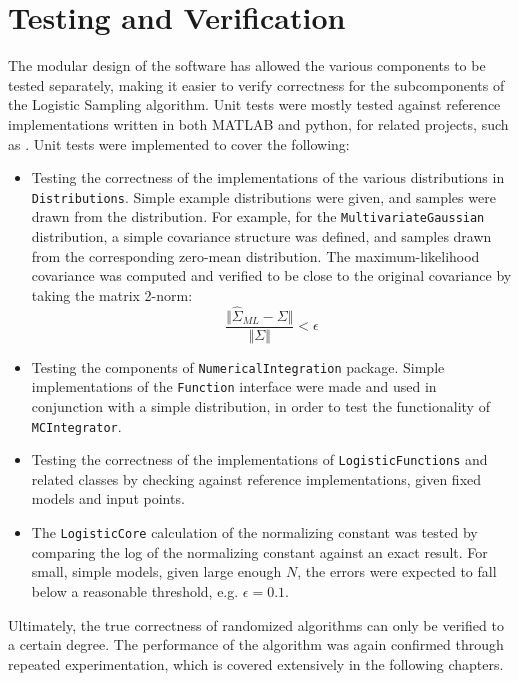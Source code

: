 \section{Testing and Verification}
The modular design of the software has allowed the various components to be tested separately, making it easier to verify correctness for the subcomponents of the Logistic Sampling algorithm. Unit tests were mostly tested against reference implementations written in both MATLAB and python, for related projects, such as \cite{Casale2017AcceleratingMethods}. Unit tests were implemented to cover the following:
\begin{itemize}
    \item Testing the correctness of the implementations of the various distributions in \texttt{Distributions}. Simple example distributions were given, and samples were drawn from the distribution. For example, for the \texttt{MultivariateGaussian} distribution, a simple covariance structure was defined, and samples drawn from the corresponding zero-mean distribution. The maximum-likelihood covariance was computed and verified to be close to the original covariance by taking the matrix 2-norm:
    \[\frac{\Vert \hat{\Sigma}_{ML} - \Sigma \Vert}{\Vert \Sigma \Vert} < \epsilon   \]
    \item Testing the components of \texttt{NumericalIntegration} package. Simple implementations of the \texttt{Function} interface were made and used in conjunction with a simple distribution, in order to test the functionality of \texttt{MCIntegrator}. 
    \item Testing the correctness of the implementations of \texttt{LogisticFunctions} and related classes by checking against reference implementations, given fixed models and input points.
    \item The \texttt{LogisticCore} calculation of the normalizing constant was tested by comparing the log of the normalizing constant against an exact result. For small, simple models, given large enough \(N\), the errors were expected to fall below a reasonable threshold, e.g. \(\epsilon = 0.1\).
\end{itemize}

Ultimately, the true correctness of randomized algorithms can only be verified to a certain degree. The performance of the algorithm was again confirmed through repeated experimentation, which is covered extensively in the following chapters.